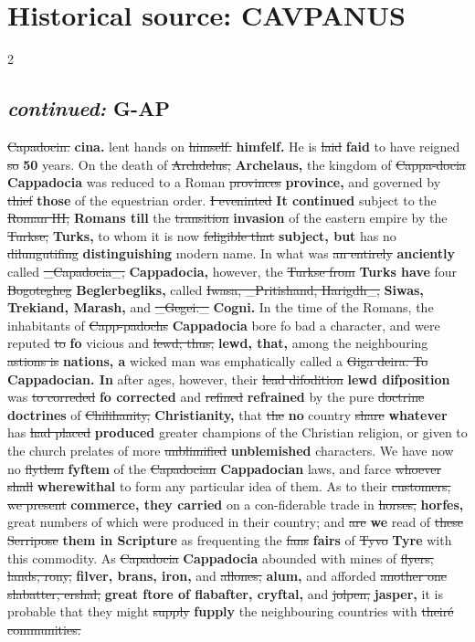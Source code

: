 \documentclass[10pt]{article}
\begin{document}
\section*{Historical source: CAVPANUS}
\begin{multicols}{2}
\subsection*{\textit{continued:} G-AP}
\sout{Capadocin.} \textbf{cina.} lent hands on \sout{himself.} \textbf{himfelf.} He is \sout{laid} \textbf{faid} to have reigned \sout{so} \textbf{50} years. On the death of \sout{Archdelus,} \textbf{Archelaus,} the kingdom of \sout{Cappa-docia} \textbf{Cappadocia} was reduced to a Roman \sout{provinces} \textbf{province,} and governed by \sout{thief} \textbf{those} of the equestrian order. \sout{I eveninted} \textbf{It continued} subject to the \sout{Roman III,} \textbf{Romans till} the \sout{transition} \textbf{invasion} of the eastern empire by the \sout{Turkse,} \textbf{Turks,} to whom it is now \sout{feligible that} \textbf{subject, but} has no \sout{dilungutifing} \textbf{distinguishing} modern name. In what was \sout{an entirely} \textbf{anciently} called \sout{\_Capadocia\_,} \textbf{Cappadocia,} however, the \sout{Turkse from} \textbf{Turks have} four \sout{Bogotegheg} \textbf{Beglerbegliks,} called \sout{Iwasa, \_Pritishand, Harigdh\_,} \textbf{Siwas, Trekiand, Marash,} and \sout{\_Gegei.\_} \textbf{Cogni.} In the time of the Romans, the inhabitants of \sout{Capp-padochs} \textbf{Cappadocia} bore fo bad a character, and were reputed \sout{to} \textbf{fo} vicious and \sout{lewd; thus,} \textbf{lewd, that,} among the neighbouring \sout{astions is} \textbf{nations, a} wicked man was emphatically called a \sout{Giga deira. To} \textbf{Cappadocian. In} after ages, however, their \sout{lead difodition} \textbf{lewd difposition} was \sout{to correded} \textbf{fo corrected} and \sout{refined} \textbf{refrained} by the pure \sout{doctrine} \textbf{doctrines} of \sout{Chilihanity,} \textbf{Christianity,} that \sout{the} \textbf{no} country \sout{share} \textbf{whatever} has \sout{had placed} \textbf{produced} greater champions of the Christian religion, or given to the church prelates of more \sout{unblimified} \textbf{unblemished} characters. We have now no \sout{flytlem} \textbf{fyftem} of the \sout{Capadocian} \textbf{Cappadocian} laws, and farce \sout{whoever shall} \textbf{wherewithal} to form any particular idea of them. As to their \sout{customers, we present} \textbf{commerce, they carried} on a con-fiderable trade in \sout{horses,} \textbf{horfes,} great numbers of which were produced in their country; and \sout{are} \textbf{we} read of \sout{these Serripose} \textbf{them in Scripture} as frequenting the \sout{fans} \textbf{fairs} of \sout{Tyvo} \textbf{Tyre} with this commodity. As \sout{Capadocia} \textbf{Cappadocia} abounded with mines of \sout{flyers, lands, rony,} \textbf{filver, brans, iron,} and \sout{allones,} \textbf{alum,} and afforded \sout{another one slabatter, ershal,} \textbf{great ftore of flabafter, cryftal,} and \sout{jolpen,} \textbf{jasper,} it is probable that they might \sout{supply} \textbf{fupply} the neighbouring countries with \sout{theiré communities.} 
\end{multicols}
\end{document}
